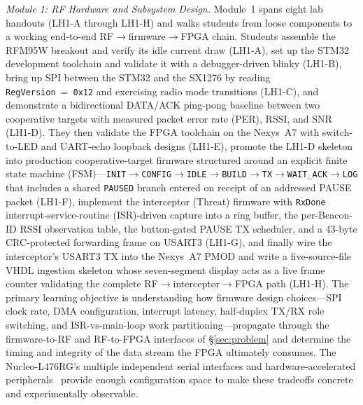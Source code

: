 \documentclass[conference]{IEEEtran}
\begin{document}
\textit{Module 1: RF Hardware and Subsystem Design.} Module~1 spans eight lab handouts (LH1-A through LH1-H) and walks students from loose components to a working end-to-end RF$\rightarrow$firmware$\rightarrow$FPGA chain. Students assemble the RFM95W breakout and verify its idle current draw (LH1-A), set up the STM32 development toolchain and validate it with a debugger-driven blinky (LH1-B), bring up SPI between the STM32 and the SX1276 by reading \texttt{RegVersion}~=~\texttt{0x12} and exercising radio mode transitions (LH1-C), and demonstrate a bidirectional DATA/ACK ping-pong baseline between two cooperative targets with measured packet error rate (PER), RSSI, and SNR (LH1-D). They then validate the FPGA toolchain on the Nexys~A7 with switch-to-LED and UART-echo loopback designs (LH1-E), promote the LH1-D skeleton into production cooperative-target firmware structured around an explicit finite state machine (FSM)---\texttt{INIT}$\rightarrow$\texttt{CONFIG}$\rightarrow$\texttt{IDLE}$\rightarrow$\texttt{BUILD}$\rightarrow$\texttt{TX}$\rightarrow$\texttt{WAIT\_ACK}$\rightarrow$\texttt{LOG} that includes a shared \texttt{PAUSED} branch entered on receipt of an addressed PAUSE packet (LH1-F), implement the interceptor (Threat) firmware with \texttt{RxDone} interrupt-service-routine (ISR)-driven capture into a ring buffer, the per-Beacon-ID RSSI observation table, the button-gated PAUSE TX scheduler, and a 43-byte CRC-protected forwarding frame on USART3 (LH1-G), and finally wire the interceptor's USART3 TX into the Nexys~A7 PMOD and write a five-source-file VHDL ingestion skeleton whose seven-segment display acts as a live frame counter validating the complete RF$\rightarrow$interceptor$\rightarrow$FPGA path (LH1-H). The primary learning objective is understanding how firmware design choices---SPI clock rate, DMA configuration, interrupt latency, half-duplex TX/RX role switching, and ISR-vs-main-loop work partitioning---propagate through the firmware-to-RF and RF-to-FPGA interfaces of \S\ref{sec:problem} and determine the timing and integrity of the data stream the FPGA ultimately consumes. The Nucleo-L476RG's multiple independent serial interfaces and hardware-accelerated peripherals~\cite{b10} provide enough configuration space to make these tradeoffs concrete and experimentally observable.
\end{document}
